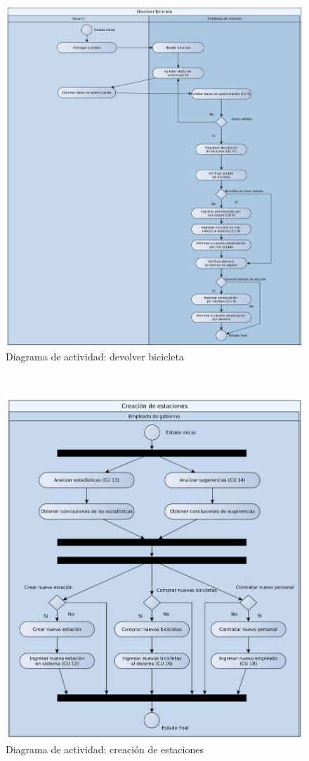 ~

\begin{figure}[H]
	\centering
	\includegraphics[scale=0.19]{imgs/DA_devolver_bicicleta.png}
	\caption{Diagrama de actividad: devolver bicicleta}
\end{figure}

~

\begin{figure}[H]
	\centering
	\includegraphics[scale=0.19]{imgs/DA_creacion_de_estaciones.png}
	\caption{Diagrama de actividad: creación de estaciones}
\end{figure}